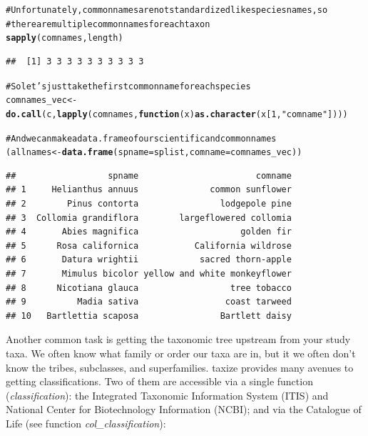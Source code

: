 \documentclass[10pt]{article}\usepackage[]{graphicx}\usepackage[]{color}
\makeatletter
\newcommand{\hlfunctioncall}[1]{\textcolor[rgb]{0.501960784313725,0,0.329411764705882}{\textbf{#1}}}%
\newcommand{\hlstring}[1]{\textcolor[rgb]{0.6,0.6,1}{#1}}%
\newcommand{\hlcomment}[1]{\textcolor[rgb]{0.180392156862745,0.6,0.341176470588235}{#1}}%
\newenvironment{kframe}{%
 \def\at@end@of@kframe{}%
 \ifinner\ifhmode%
  \def\at@end@of@kframe{\end{minipage}}%
  \begin{minipage}{\columnwidth}%
 \fi\fi%
 \def\FrameCommand##1{\hskip\@totalleftmargin \hskip-\fboxsep
 \colorbox{shadecolor}{##1}\hskip-\fboxsep
     \hskip-\linewidth \hskip-\@totalleftmargin \hskip\columnwidth}%
 \MakeFramed {\advance\hsize-\width
   \@totalleftmargin\z@ \linewidth\hsize
   \@setminipage}}%
 {\par\unskip\endMakeFramed%
 \at@end@of@kframe}
\newenvironment{knitrout}{}{} %
\makeatother
\begin{document}
\begin{knitrout}
\begin{kframe}
\begin{alltt}
\hlcomment{# Unfortunately, common names are not standardized like species names, so}
\hlcomment{# there are multiple common names for each taxon}
\hlfunctioncall{sapply}(comnames, length)
\end{alltt}
\begin{verbatim}
##  [1] 3 3 3 3 3 3 3 3 3 3
\end{verbatim}
\begin{alltt}

\hlcomment{# So let's just take the first common name for each species}
comnames_vec <- \hlfunctioncall{do.call}(c, \hlfunctioncall{lapply}(comnames, \hlfunctioncall{function}(x) \hlfunctioncall{as.character}(x[1, \hlstring{"comname"}])))

\hlcomment{# And we can make a data.frame of our scientific and common names}
(allnames <- \hlfunctioncall{data.frame}(spname = splist, comname = comnames_vec))
\end{alltt}
\begin{verbatim}
##                  spname                       comname
## 1     Helianthus annuus              common sunflower
## 2        Pinus contorta                lodgepole pine
## 3  Collomia grandiflora        largeflowered collomia
## 4       Abies magnifica                    golden fir
## 5      Rosa californica           California wildrose
## 6       Datura wrightii            sacred thorn-apple
## 7       Mimulus bicolor yellow and white monkeyflower
## 8      Nicotiana glauca                  tree tobacco
## 9          Madia sativa                 coast tarweed
## 10   Bartlettia scaposa                Bartlett daisy
\end{verbatim}
\end{kframe}
\end{knitrout}


Another common task is getting the taxonomic tree upstream from your study taxa. We often know what family or order our taxa are in, but it we often don't know the tribes, subclasses, and superfamilies. taxize provides many avenues to getting classifications. Two of them are accessible via a single function (\emph{classification}): the Integrated Taxonomic Information System (ITIS) and National Center for Biotechnology Information (NCBI); and via the Catalogue of Life (see function \emph{col\_classification}):
\end{document}
